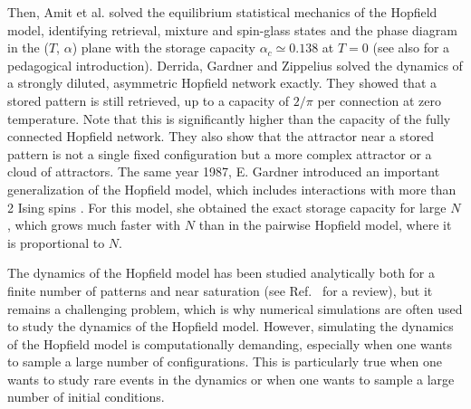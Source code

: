 Then, Amit et al. solved the equilibrium statistical mechanics of the Hopfield model, identifying retrieval, mixture and spin-glass states and the phase diagram in the ($T$, $\alpha$) plane with the storage capacity $\alpha_c \simeq 0.138$ at $T = 0$ \cite{Amit1985,AMIT1987,Amit1989,Sompolinsky1988} (see also \cite{Hertz1991} for a pedagogical introduction). Derrida, Gardner and Zippelius \cite{Derrida1987} solved the dynamics of a strongly diluted, asymmetric Hopfield network exactly. They showed that a stored pattern is still retrieved, up to a capacity of $2/\pi$ per connection at zero temperature. Note that this is significantly higher than the capacity of the fully connected Hopfield network. They also show that the attractor near a stored pattern is not a single fixed configuration but a more complex attractor or a cloud of attractors. The same year 1987, E. Gardner introduced an important generalization of the Hopfield model, which includes interactions with more than 2 Ising spins \cite{Gardner1987b}. For this model, she obtained the exact storage capacity for large $N$, which grows much faster with $N$ than in the pairwise Hopfield model, where it is proportional to $N$.

The dynamics of the Hopfield model has been studied analytically both for a finite number of patterns and near saturation (see Ref.~\cite{Coolen2001} for a review), but it remains a challenging problem, which is why numerical simulations are often used to study the dynamics of the Hopfield model. However, simulating the dynamics of the Hopfield model is computationally demanding, especially when one wants to sample a large number of configurations. This is particularly true when one wants to study rare events in the dynamics or when one wants to sample a large number of initial conditions.

